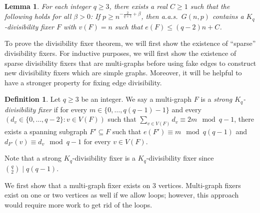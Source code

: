 \documentclass[11pt]{article}
\numberwithin{equation}{section}
\newcounter{i}
\theoremstyle{plain}
\newtheorem{lem}[thm]{Lemma}
\theoremstyle{plain} %
\theoremstyle{definition}
\newtheorem{definition}[thm]{Definition}
\newcommand{\aas}{a.a.s.\ }
\begin{document}
\begin{lem}\label{lem:DivFixer}
For each integer $q\ge 3$, there exists a real $C\ge 1$ such that the following holds for all $\beta > 0$: If $p \ge n^{-\frac{2}{q+1}+\beta}$, then \aas $G(n,p)$ contains a $K_q$-divisibility fixer $F$ with $v(F)=n$ such that $e(F) \le (q-2)n + C$.
\end{lem}



To prove the divisibility fixer theorem, we will first show the existence of ``sparse'' divisibility fixers.  For inductive purposes, we will first show the existence of sparse divisibility fixers that are multi-graphs before using fake edges to construct new divisibility fixers which are simple graphs.  Moreover, it will be helpful to have a stronger property for fixing edge divisibility.

\begin{definition}
Let $q \ge 3$ be an integer.  We say a multi-graph $F$ is a \textit{strong $K_q$-divisibility fixer} if for every $m \in \{0, \dots, q(q-1)-1\}$ and every $(d_v \in \{0, \dots, q - 2\} : v \in V(F))$ such that $\sum_{v\in V(F)}d_v \equiv 2m \mod q - 1$, there exists a spanning subgraph $F' \subseteq F$ such that $e(F') \equiv m \mod q(q-1)$ and $d_{F'}(v) \equiv d_v \mod q - 1$ for every $v \in V(F)$.
\end{definition}

Note that a strong $K_q$-divisibility fixer is a $K_q$-divisibility fixer since $\binom{q}{2}\mid q(q - 1)$.

We first show that a multi-graph fixer exists on $3$ vertices.  Multi-graph fixers exist on one or two vertices as well if we allow loops; however, this approach would require more work to get rid of the loops.
\end{document}
